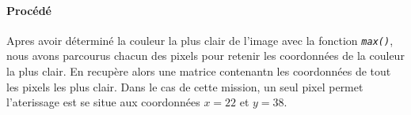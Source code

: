 	\paragraph{Procédé}	Apres avoir déterminé la couleur la plus clair de l'image avec la fonction \emph{\texttt{max()}}, nous avons parcourus chacun des pixels pour retenir les coordonnées de la couleur la plus clair. En recupère alors une matrice contenantn les coordonnées de tout les pixels les plus clair. Dans le cas de cette mission, un seul pixel permet l'aterissage est se situe aux coordonnées $x=22$ et $y=38$.